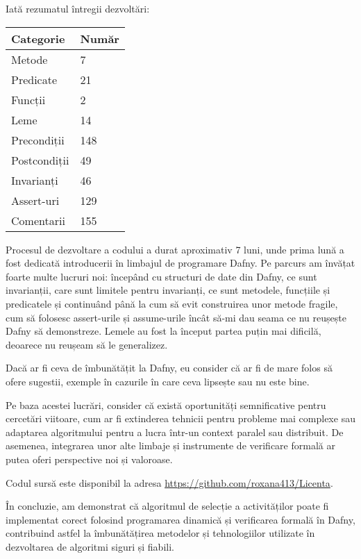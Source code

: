 Iată rezumatul întregii dezvoltări:
\begin{table}[h!]
\centering
\begin{tabular}{>{\raggedright}p{7cm} p{3cm}}
    \textbf{Categorie} & \textbf{Număr} \\
    \midrule
    Metode & 7 \\
    Predicate & 21 \\
    Funcții & 2 \\
    Leme & 14 \\
    Precondiții & 148 \\
    Postcondiții & 49 \\
    Invarianți & 46 \\
    Assert-uri & 129 \\
    Comentarii & 155 \\
\end{tabular}
\end{table}

Procesul de dezvoltare a codului a durat aproximativ 7 luni, unde prima lună a fost dedicată introducerii în limbajul de programare Dafny. 
Pe parcurs am învățat foarte multe lucruri noi: începând cu structuri de date din Dafny, ce sunt invarianții, care sunt limitele pentru invarianți, ce sunt metodele, funcțiile și predicatele și continuând până la cum să evit construirea unor metode fragile, cum să folosesc assert-urile și assume-urile încât să-mi dau seama ce nu reușește Dafny să demonstreze. Lemele au fost la început partea puțin mai dificilă, deoarece nu reușeam să le generalizez.


Dacă ar fi ceva de îmbunătățit la Dafny, eu consider că ar fi de mare folos să ofere sugestii, exemple în cazurile în care ceva lipsește sau nu este bine.   

Pe baza acestei lucrări, consider că există oportunități semnificative pentru cercetări viitoare, cum ar fi extinderea tehnicii pentru probleme mai complexe sau adaptarea algoritmului pentru a lucra într-un context paralel sau distribuit. De asemenea, integrarea unor alte limbaje și instrumente de verificare formală ar putea oferi perspective noi și valoroase.

Codul sursă este disponibil la adresa \url{https://github.com/roxana413/Licenta}.

În concluzie, am demonstrat că algoritmul de selecție a activităților poate fi implementat corect folosind programarea dinamică și verificarea formală în Dafny, contribuind astfel la îmbunătățirea metodelor și tehnologiilor utilizate în dezvoltarea de algoritmi siguri și fiabili.